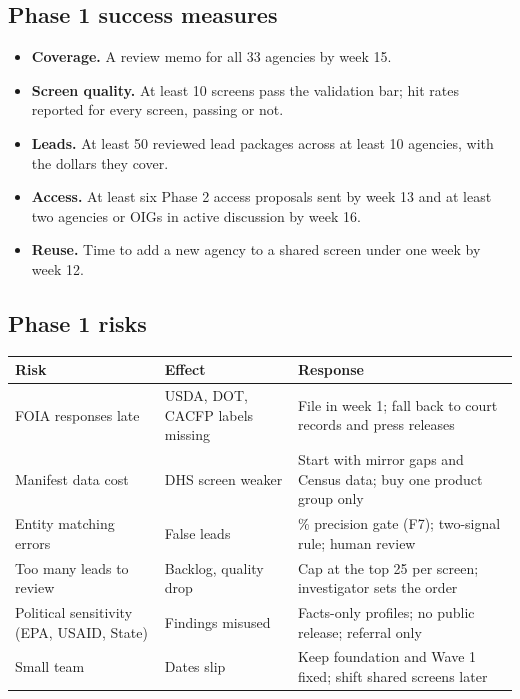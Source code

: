 \documentclass[letterpaper,11pt]{article}
\providecommand{\tightlist}{\setlength{\itemsep}{0pt}\setlength{\parskip}{0pt}}
\begin{document}
\hypertarget{phase-1-success-measures}{%
\subsection{Phase 1 success measures}\label{phase-1-success-measures}}

\begin{itemize}
\tightlist
\item
  \textbf{Coverage.} A review memo for all 33 agencies by week 15.
\item
  \textbf{Screen quality.} At least 10 screens pass the validation bar;
  hit rates reported for every screen, passing or not.
\item
  \textbf{Leads.} At least 50 reviewed lead packages across at least 10
  agencies, with the dollars they cover.
\item
  \textbf{Access.} At least six Phase 2 access proposals sent by week 13
  and at least two agencies or OIGs in active discussion by week 16.
\item
  \textbf{Reuse.} Time to add a new agency to a shared screen under one
  week by week 12.
\end{itemize}

\hypertarget{phase-1-risks}{%
\subsection{Phase 1 risks}\label{phase-1-risks}}

\begingroup\small\setlength{\tabcolsep}{4pt}\renewcommand{\arraystretch}{1.25}
\begin{longtable}[l]{@{}>{\raggedright\arraybackslash}p{}>{\raggedright\arraybackslash}p{}>{\raggedright\arraybackslash}p{}@{}}
\rowcolor{coolblack}\leavevmode\color{white}\bfseries Risk & \leavevmode\color{white}\bfseries Effect & \leavevmode\color{white}\bfseries Response \\
\endhead
FOIA responses late & USDA, DOT, CACFP labels missing & File in week 1; fall back to court records and press releases \\
Manifest data cost & DHS screen weaker & Start with mirror gaps and Census data; buy one product group only \\
Entity matching errors & False leads & 95\% precision gate (F7); two-signal rule; human review \\
Too many leads to review & Backlog, quality drop & Cap at the top 25 per screen; investigator sets the order \\
Political sensitivity (EPA, USAID, State) & Findings misused & Facts-only profiles; no public release; referral only \\
Small team & Dates slip & Keep foundation and Wave 1 fixed; shift shared screens later \\
\end{longtable}\endgroup
\end{document}
